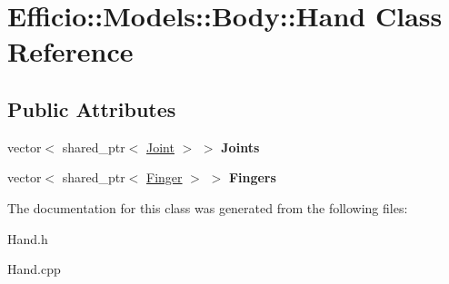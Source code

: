\hypertarget{class_efficio_1_1_models_1_1_body_1_1_hand}{}\section{Efficio\+:\+:Models\+:\+:Body\+:\+:Hand Class Reference}
\label{class_efficio_1_1_models_1_1_body_1_1_hand}
\subsection*{Public Attributes}
\begin{DoxyCompactItemize}
\item 
vector$<$ shared\+\_\+ptr$<$ \hyperlink{class_efficio_1_1_models_1_1_body_1_1_joint}{Joint} $>$ $>$ {\bfseries Joints}\hypertarget{class_efficio_1_1_models_1_1_body_1_1_hand_a4759009c8265994e4ec0f175336a4d8a}{}\label{class_efficio_1_1_models_1_1_body_1_1_hand_a4759009c8265994e4ec0f175336a4d8a}

\item 
vector$<$ shared\+\_\+ptr$<$ \hyperlink{class_efficio_1_1_models_1_1_body_1_1_finger}{Finger} $>$ $>$ {\bfseries Fingers}\hypertarget{class_efficio_1_1_models_1_1_body_1_1_hand_a9daa184cfdca76ebb91dccd617b7173a}{}\label{class_efficio_1_1_models_1_1_body_1_1_hand_a9daa184cfdca76ebb91dccd617b7173a}

\end{DoxyCompactItemize}


The documentation for this class was generated from the following files\+:\begin{DoxyCompactItemize}
\item 
Hand.\+h\item 
Hand.\+cpp\end{DoxyCompactItemize}
